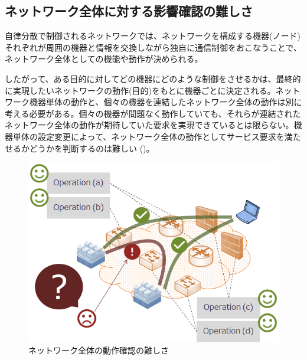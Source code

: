  \subsection{ネットワーク全体に対する影響確認の難しさ}

自律分散で制御されるネットワークでは、ネットワークを構成する機器(ノード)
それぞれが周囲の機器と情報を交換しながら独自に通信制御をおこなうことで、
ネットワーク全体としての機能や動作が決められる。

したがって、ある目的に対してどの機器にどのような制御をさせるかは、最終的
に実現したいネットワークの動作(目的)をもとに機器ごとに決定される。ネット
ワーク機器単体の動作と、個々の機器を連結したネットワーク全体の動作は別に
考える必要がある。個々の機器が問題なく動作していても、それらが連結された
ネットワーク全体の動作が期待していた要求を実現できているとは限らない。機
器単体の設定変更によって、ネットワーク全体の動作としてサービス要求を満た
せるかどうかを判断するのは難しい
()。

 \begin{figure}[h]
  \centering
  \includegraphics[scale=0.5]{img/difficulty-of-network-operation.png}
  \caption{ネットワーク全体の動作確認の難しさ}
  \label{fig:difficulty-of-network-operation}
 \end{figure}

